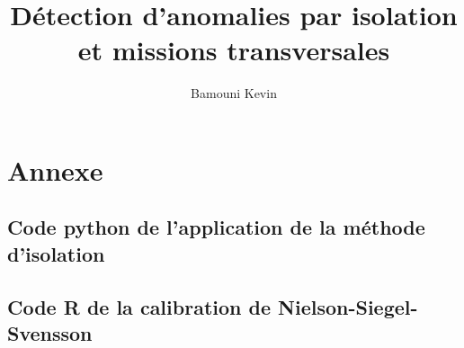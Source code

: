 \documentclass[12pt,a4paper]{report}
\author{Bamouni Kevin}
\title{Détection d'anomalies par isolation et missions transversales}
\begin{document}


\maketitle





\setcounter{page}{1} %







{\setlength{\baselineskip}{0.9\baselineskip}
\par}


\setcounter{page}{1} 









\chapter*{Annexe}

\section*{Code python de l'application de la méthode d'isolation}



\section*{Code R de la calibration de Nielson-Siegel-Svensson}



{\setlength{\baselineskip}{0.9\baselineskip}
\setcounter{tocdepth}{5} %
\tableofcontents %
\par}

\listoffigures

\listoftables



\cite{ManfredGilli2010}
\cite{Liu2012}
\cite{Hull2015}
\cite{STORN1997}
\cite{Befec-PriceWaterhouse1996}
\\
\end{document}
